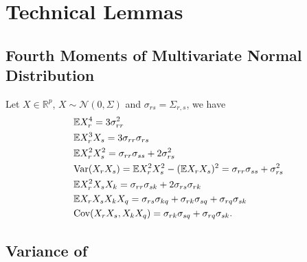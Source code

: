 \section{Technical Lemmas}
\label{sec:technical_lemmas}
\subsection{\bf Fourth Moments of Multivariate Normal Distribution}
\label{subsec: gaussian_fourth_moments}
Let $X\in \mathbb{R}^p$, $X\sim \mathcal{N}(0, \Sigma)$ and $\sigma_{rs} = \Sigma_{r,s}$, we have 
\begin{equation}
\label{eq:gauss_fourth_moment}
\begin{aligned}
&\mathbb{E} X^4_r = 3\sigma_{rr}^2\\
&\mathbb{E}X^3_rX_s = 3\sigma_{rr}\sigma_{rs}\\
&\mathbb{E}X^2_rX^2_s = \sigma_{rr}\sigma_{ss}+2\sigma^2_{rs}\\
&\mbox{Var}(X_rX_s) = \mathbb{E}X^2_rX^2_s-(\mathbb{E}X_rX_s)^2 =\sigma_{rr}\sigma_{ss}+\sigma^2_{rs}\\
&\mathbb{E}X_r^2X_sX_k = \sigma_{rr}\sigma_
{sk}+2\sigma_{rs}\sigma_{rk}\\
&\mathbb{E}X_rX_sX_kX_q = \sigma_{rs}\sigma_{kq}+\sigma_{rk}\sigma_{sq}+\sigma_{rq}\sigma_{sk}\\
&\mbox{Cov}(X_rX_s, X_kX_q) = \sigma_{rk}\sigma_{sq}+\sigma_{rq}\sigma_{sk}.
\end{aligned}
\end{equation}


\subsection{Variance of }

